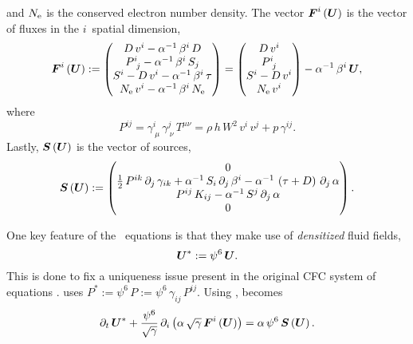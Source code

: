 and $N_{\mathrm{e}}$ is the conserved electron number density.
The vector $\boldsymbol{F}^{i}\left(\boldsymbol{U}\right)$
is the vector of fluxes in the $i$\myth\ spatial dimension,
\begin{equation}
  \boldsymbol{F}^{i}\left(\boldsymbol{U}\right)
  :=\begin{pmatrix}
  D\,v^{i}-\alpha^{-1}\,\beta^{i}\,D\\
  P^{i}_{~j}-\alpha^{-1}\,\beta^{i}\,S_{j}\\
  S^{i}-D\,v^{i}-\alpha^{-1}\,\beta^{i}\,\tau\\
  N_{\mathrm{e}}\,v^{i}-\alpha^{-1}\,\beta^{i}\,N_{\mathrm{e}}
  \end{pmatrix}
  =\begin{pmatrix}
  D\,v^{i}\\
  P^{i}_{~j}\\
  S^{i}-D\,v^{i}\\
  N_{\mathrm{e}}\,v^{i}
  \end{pmatrix}
  -\alpha^{-1}\,\beta^{i}\,\boldsymbol{U},
\end{equation}
where
\begin{equation}
  P^{ij}=\gamma^{i}_{~\mu}\,\gamma^{j}_{~\nu}\,T^{\mu\nu}
  =\rho\,h\,W^{2}\,v^{i}\,v^{j}+p\,\gamma^{ij}.
\end{equation}
Lastly, $\boldsymbol{S}\left(\boldsymbol{U}\right)$ is the vector of sources,
\begin{equation}
  \boldsymbol{S}\left(\boldsymbol{U}\right)
  :=\begin{pmatrix}
  0\\
  \frac{1}{2}\,P^{ik}\,\partial_{j}\,\gamma_{ik}
  +\alpha^{-1}\,S_{i}\,\partial_{j}\,\beta^{i}
  -\alpha^{-1}\,\left(\tau+D\right)\,\partial_{j}\,\alpha\\
  P^{ij}\,K_{ij}-\alpha^{-1}\,S^{j}\,\partial_{j}\,\alpha\\
  0
  \end{pmatrix}.
\end{equation}

One key feature of the \xcfc\ equations is that they make use of
{\sl densitized} fluid fields,
\begin{equation}
  \boldsymbol{U}^{*}:=\psi^{6}\,\boldsymbol{U}.
  \label{eq.xcfcDensitized}
\end{equation}
This is done to fix a uniqueness issue present in the original CFC system of
equations \citep[Eqs. (18), (26), and (35) in][]{wmm1996}.
 uses
$P^{*}:=\psi^{6}\,P:=\psi^{6}\,\gamma_{ij}\,P^{ij}$.
Using ,  becomes
\begin{equation}
  \partial_{t}\,\boldsymbol{U}^{*}
  +\frac{\psi^{6}}{\sqrt{\gamma}}\,
  \partial_{i}\left(\alpha\,\sqrt{\gamma}\,\boldsymbol{F}^{i}\left(\boldsymbol{U}\right)\right)
  =\alpha\,\psi^{6}\,\boldsymbol{S}\left(\boldsymbol{U}\right).
  \label{eq.consLaws2}
\end{equation}

